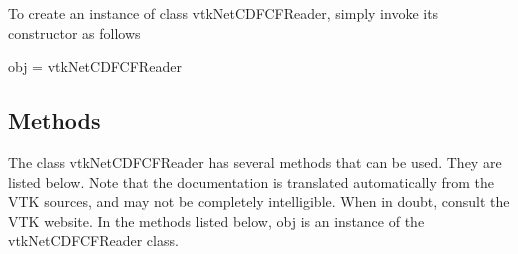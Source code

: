 To create an instance of class vtk\-Net\-C\-D\-F\-C\-F\-Reader, simply invoke its constructor as follows \begin{DoxyVerb}  obj = vtkNetCDFCFReader
\end{DoxyVerb}
 \hypertarget{vtkwidgets_vtkxyplotwidget_Methods}{}\subsection{Methods}\label{vtkwidgets_vtkxyplotwidget_Methods}
The class vtk\-Net\-C\-D\-F\-C\-F\-Reader has several methods that can be used. They are listed below. Note that the documentation is translated automatically from the V\-T\-K sources, and may not be completely intelligible. When in doubt, consult the V\-T\-K website. In the methods listed below, {\ttfamily obj} is an instance of the vtk\-Net\-C\-D\-F\-C\-F\-Reader class. 
